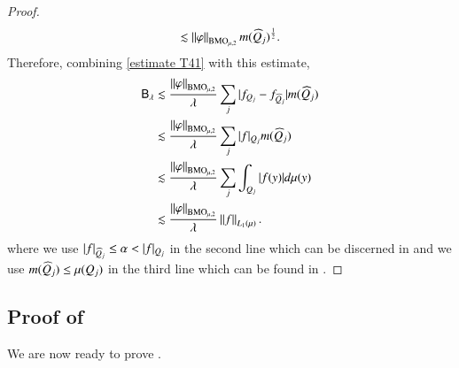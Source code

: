 \documentclass[leqno]{amsart}
\begin{document}
\begin{proof}
\begin{align*}
\lesssim\left\| \varphi \right\|_{{\rm BMO}_{\mu,2}}m(\widehat{Q}_{j})^{\frac{1}{2}}.
\end{align*}
Therefore, combining \eqref{estimate T41} with this estimate,
\begin{align*}
\mathsf{B}_{\lambda}
&\lesssim\frac{\left\| \varphi \right\|_{{\rm BMO}_{\mu,2}}}{\lambda}\sum_{j}|f_{Q_{j}}-f_{\widehat{Q}_{j}}|m(\widehat{Q}_{j})\\
&\lesssim\frac{\left\| \varphi \right\|_{{\rm BMO}_{\mu,2}}}{\lambda}\sum_{j}|f|_{Q_{j}}m(\widehat{Q}_{j})\\
&\lesssim\frac{\left\| \varphi \right\|_{{\rm BMO}_{\mu,2}}}{\lambda}\sum_{j}\int_{Q_{j}}|f(y)|d\mu(y)\\
&\lesssim\frac{\left\| \varphi \right\|_{{\rm BMO}_{\mu,2}}}{\lambda}\left\| f \right\|_{L_{1}(\mu)}.
\end{align*}
where we use $|f|_{\wh{Q}_{j}}\leq\alpha<|f|_{Q_{j}}$ in the second line which can be discerned in \cite[(3.2) in page 57]{LMP2014} and we use $m(\widehat{Q}_{j})\leq\mu(Q_{j})$ in the third line which can be found in \cite[page 51]{LMP2014}. 


\end{proof}




\subsection{Proof of }\label{sec-detailed proof}

We are now ready to prove .
\end{document}
